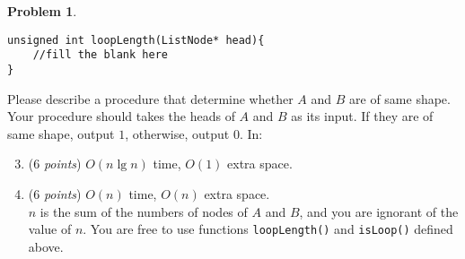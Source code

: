 \documentclass[12pt,a4paper]{report}
\newcommand{\points}[1]{ ($#1$ \textit{points}) }
\theoremstyle{definition}
\newtheorem{problem}{\textbf{Problem}}
\theoremstyle{definition}
\begin{document}
\begin{problem}
\begin{enumerate}[label=\arabic*.]
\begin{enumerate}[label=\alph*.]
\begin{lstlisting}
unsigned int loopLength(ListNode* head){
    //fill the blank here
}
\end{lstlisting}
\end{enumerate}
        Please describe a procedure that determine whether $A$ and $B$ are of same shape. Your procedure should takes the heads of $A$ and $B$ as its input. If they are of same shape, output $1$, otherwise, output $0$. In:
\begin{enumerate}[label=\alph*.]
    \setcounter{enumii}{2}
        \item \points{6}$O(n \lg n)$ time, $O(1)$ extra space.
        \item \points{6}$O(n)$ time, $O(n)$ extra space.\\
    \noindent $n$ is the sum of the numbers of nodes of $A$ and $B$, and you are ignorant of the value of $n$. You are free to use functions \texttt{loopLength()} and \texttt{isLoop()} defined above.
    \end{enumerate}

\end{enumerate}
\end{problem}

\newpage
\end{document}
